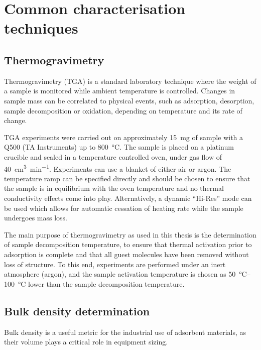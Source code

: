 
\graphicspath{ {\thisappx/figures/} }

\chapter{Common characterisation techniques}

\section{Thermogravimetry}\label{appx:char:TGA}

Thermogravimetry (TGA) is a standard laboratory technique where the
weight of a sample is monitored while ambient temperature is controlled.
Changes in sample mass can be correlated to physical events, such
as adsorption, desorption, sample decomposition or oxidation, depending
on temperature and its rate of change.

TGA experiments were carried out on approximately \SI{15}{\milli\gram} of 
sample with a Q500 (TA Instruments) up to \SI{800}{\degreeCelsius}.
The sample is placed on a platinum crucible and sealed in a temperature
controlled oven, under gas flow of \SI{40}{\cm\cubed\per\minute}.
Experiments can use a blanket of either air or argon. The temperature
ramp can be specified directly and should be chosen to ensure 
that the sample is in equilibrium with the oven temperature and no
thermal conductivity effects come into play. Alternatively,
a dynamic “Hi-Res” mode can be used which allows for automatic
cessation of heating rate while the sample undergoes mass loss.

The main purpose of thermogravimetry as used in this thesis is the
determination of sample decomposition temperature, to ensure
that thermal activation prior to adsorption is complete and 
that all guest molecules have been removed without loss of
structure. To this end, experiments are performed under an inert
atmosphere (argon), and the sample activation temperature is chosen
as \SIrange{50}{100}{\degreeCelsius} lower than the sample 
decomposition temperature.

\section{Bulk density determination}

Bulk density is a useful metric for the industrial use of adsorbent
materials, as their volume plays a critical role in equipment sizing.

